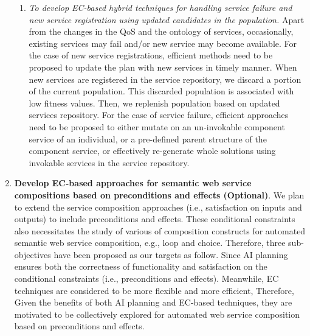 \begin{enumerate}
\begin{enumerate}
 
 \item \emph{To develop EC-based hybrid techniques for handling service failure and new service registration using updated candidates in the population.} Apart from the changes in the QoS and the ontology of services, occasionally, existing services may fail and/or new service may become available. For the case of new service registrations, efficient methods need to be proposed to update the plan with new services in timely manner. When new services are registered in the service repository, we discard a portion of the current population. This discarded population is associated with low fitness values. Then, we replenish population based on updated services repository. For the case of service failure, efficient approaches need to be proposed to either mutate on an un-invokable component service of an individual, or a pre-defined parent structure of the component service, or effectively re-generate whole solutions using invokable services in the service repository. 
 \end{enumerate}
   
 \item \textbf{Develop EC-based approaches for semantic web service compositions based on preconditions and effects (Optional)}. We plan to extend the service composition approaches (i.e., satisfaction on inputs and outputs) to include preconditions and effects. These conditional constraints also necessitates the study of various of composition constructs for automated semantic web service composition, e.g., loop and choice. Therefore, three sub-objectives have been proposed as our targets as follow. Since AI planning ensures both the correctness of functionality and satisfaction on the conditional constraints (i.e., preconditions and effects). Meanwhile, EC techniques are considered to be more flexible and more efficient, Therefore, Given the benefits of both AI planning and EC-based techniques, they are motivated to be collectively explored for automated web service composition based on preconditions and effects.
 
 \begin{enumerate}
 

\end{enumerate}
\end{enumerate}
